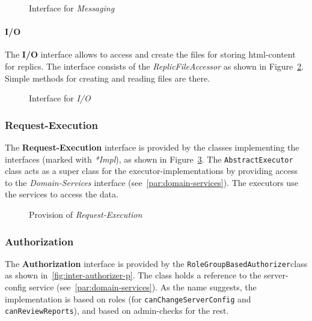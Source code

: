 \begin{figure}
    \centering

    \caption{Interface for \textit{Messaging}}
    \label{fig:domain-messaging}
\end{figure}

\paragraph{I/O}\label{par:io}
The \textbf{I/O} interface allows to access and create the files for storing html-content for replics.
The interface consists of the \textit{ReplicFileAccessor} as shown in Figure~\ref{fig:domain-io}.
Simple methods for creating and reading files are there.

\begin{figure}
    \centering

    \caption{Interface for \textit{I/O}}
    \label{fig:domain-io}
\end{figure}

\subsubsection{Request-Execution}
The \textbf{Request-Execution} interface is provided by the classes implementing the interfaces (marked with \textit{*Impl}), as shown in Figure~\ref{fig:inter-executors-d}.
The \texttt{AbstractExecutor} class acts as a super class for the executor-implementations by providing access to the \textit{Domain-Services} interface (see~\ref{par:domain-services}).
The executors use the services to access the data.

\begin{figure}
    \centering

    \caption{Provision of \textit{Request-Execution}}
    \label{fig:inter-executors-d}
\end{figure}

\subsubsection{Authorization}
The \textbf{Authorization} interface is provided by the \texttt{RoleGroupBasedAuthorizer}class as shown in~\ref{fig:inter-authorizer-p}.
The class holds a reference to the server-config service (see~\ref{par:domain-services}). \newline
As the name suggests, the implementation is based on roles (for \texttt{canChangeServerConfig} and \texttt{canReviewReports}), and based on admin-checks for the rest.

